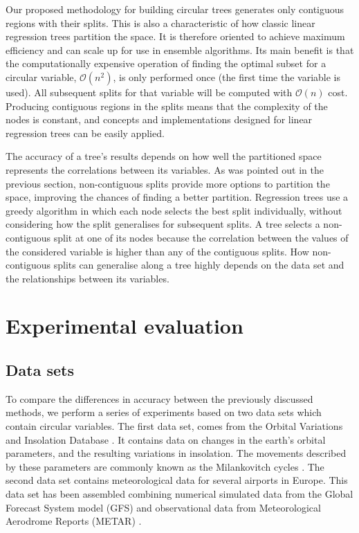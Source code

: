 \documentclass[times,twocolumn,final,authoryear]{elsarticle}
\begin{document}
Our proposed methodology for building circular trees generates only contiguous regions with their splits. This is also a characteristic of how classic linear regression trees partition the space. It is therefore oriented to achieve maximum efficiency and can scale up for use in ensemble algorithms. Its main benefit is that the computationally expensive operation of finding the optimal subset for a circular variable, $\mathcal{O}(n^2)$, is only performed once (the first time the variable is used). All subsequent splits for that variable will be computed with $\mathcal{O}(n)$ cost. Producing contiguous regions in the splits means that the complexity of the nodes is constant, and concepts and implementations designed for linear regression trees can be easily applied.

The accuracy of a tree's results depends on how well the partitioned space represents the correlations between its variables. As was pointed out in the previous section, non-contiguous splits provide more options to partition the space, improving the chances of finding a better partition. Regression trees use a greedy algorithm in which each node selects the best split individually, without considering how the split generalises for subsequent splits. A tree selects a non-contiguous split at one of its nodes because the correlation between the values of the considered variable is higher than any of the contiguous splits. How non-contiguous splits can generalise along a tree highly depends on the data set and the relationships between its variables.


\section{Experimental evaluation}

\subsection{Data sets}

To compare the differences in accuracy between the previously discussed methods, we perform a series of experiments based on two data sets which contain circular variables. The first data set, comes from the Orbital Variations and Insolation Database \citep{Berger1991}. It contains data on changes in the earth's orbital parameters, and the resulting variations in insolation. The movements described by these parameters are commonly known as the Milankovitch cycles \citep{Hays1976}. The second data set contains meteorological data for several airports in Europe. This data set has been assembled combining numerical simulated data from the Global Forecast System model (GFS) \citep{CampanaCaplan2005} and observational data from Meteorological Aerodrome Reports (METAR) \citep{WMO1995}.
\end{document}
